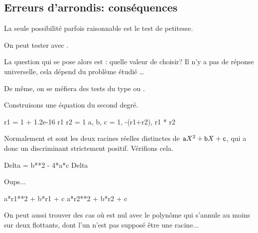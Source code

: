 \subsection{Erreurs d'arrondis: conséquences}


\vspace{0.5cm}

 La seule possibilité parfois raisonnable est  le \og test de petitesse\fg.
\begin{exemple}
  On peut tester  avec .
\end{exemple}

 La question qui se pose alors est : quelle valeur de  choisir? Il n'y a pas de réponse universelle,  cela dépend du problème étudié \ldots{}


De même, on se méfiera des tests du type  ou .


\begin{exemple}
  
\end{exemple}
 Construisons une équation du second degré.

\begin{pyconsole}
r1 = 1 + 1.2e-16
r1
r2 = 1
a, b, c = 1, -(r1+r2), r1 * r2
\end{pyconsole}
Normalement  et  sont les deux racines réelles distinctes de
$\text{\texttt{a}}X^2+\text{\texttt{b}}X+\text{\texttt{c}}$, qui a donc un discriminant strictement positif.
Vérifions cela.
\begin{pyconsole}
Delta = b**2 - 4*a*c
Delta
\end{pyconsole}
Oups...
\begin{pyconsole}
a*r1**2 + b*r1 + c
a*r2**2 + b*r2 + c
\end{pyconsole}

On peut aussi trouver des cas où  est nul avec le polynôme
qui s'annule au moins sur deux flottants, dont l'un n'est pas supposé
être une racine...

%
%

